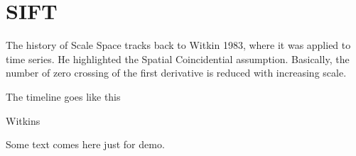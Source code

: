 \chapter{SIFT}

The history of Scale Space tracks back to Witkin 1983, where it was applied to time series.  He highlighted the Spatial Coincidential assumption.
Basically, the number of zero crossing of the first derivative is reduced with increasing scale.


The timeline goes like this

Witkins


\begin{story}
Some text comes here just for demo.
\kant[3]
\end{story}

